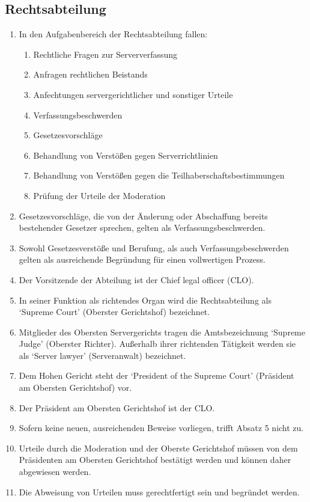 \documentclass{article}
\begin{document}
\subsection{Rechtsabteilung}
\begin{enumerate}[(1)]
	\item In den Aufgabenbereich der Rechtsabteilung fallen:
	\begin{enumerate}[1.]
		\item Rechtliche Fragen zur Serververfassung
		\item Anfragen rechtlichen Beistands
		\item Anfechtungen servergerichtlicher und sonstiger Urteile
		\item Verfassungsbeschwerden
		\item Gesetzesvorschläge
		\item Behandlung von Verstößen gegen Serverrichtlinien
		\item Behandlung von Verstößen gegen die Teilhaberschaftsbestimmungen
		\item Prüfung der Urteile der Moderation
	\end{enumerate}
	\item Gesetzesvorschläge, die von der Änderung oder Abschaffung bereits bestehender Gesetzer sprechen, gelten als Verfassungsbeschwerden.
	\item Sowohl Gesetzesverstöße und Berufung, als auch Verfassungsbeschwerden gelten als ausreichende Begründung für einen vollwertigen Prozess.
	\item Der Vorsitzende der Abteilung ist der Chief legal officer (CLO).
	\item In seiner Funktion als richtendes Organ wird die Rechtsabteilung als `Supreme Court' (Oberster Gerichtshof) bezeichnet.
	\item Mitglieder des Obersten Servergerichts tragen die Amtsbezeichnung `Supreme Judge' (Oberster Richter). Außerhalb ihrer richtenden Tätigkeit werden sie als `Server lawyer' (Serveranwalt) bezeichnet.
	\item Dem Hohen Gericht steht der `President of the Supreme Court' (Präsident am Obersten Gerichtshof) vor.
	\item Der Präsident am Obersten Gerichtshof ist der CLO.\@
	\item Sofern keine neuen, ausreichenden Beweise vorliegen, trifft Absatz 5 nicht zu.
	\item Urteile durch die Moderation und der Oberste Gerichtshof müssen von dem Präsidenten am Obersten Gerichtshof bestätigt werden und können daher abgewiesen werden.
	\item Die Abweisung von Urteilen muss gerechtfertigt sein und begründet werden.
\end{enumerate}
\end{document}
